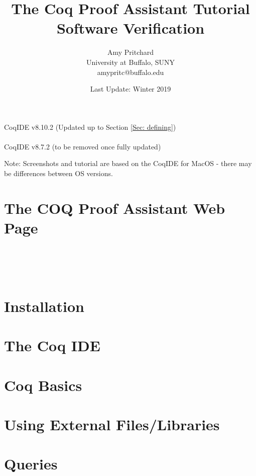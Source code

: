\documentclass{article}
\title{\textbf{The Coq Proof Assistant Tutorial} 
	\\ Software Verification}
\author{Amy Pritchard 
	\\ University at Buffalo, SUNY
	\\ amypritc@buffalo.edu}
\date{Last Update: Winter 2019}
\begin{document}
\maketitle

\begin{center}
	CoqIDE v8.10.2 (Updated up to Section \ref{Sec: defining})
\\~\\
	CoqIDE v8.7.2 (to be removed once fully updated)
\end{center}

\vfill
\noindent
{\footnotesize Note: Screenshots and tutorial are based on the CoqIDE for MacOS - there may be differences between OS versions. }

\newpage
\tableofcontents


\newpage
\section{The COQ Proof Assistant Web Page} 
	\label{Sec: webpage}
	

~\\~\\~\\
\section{Installation} 
	\label{Sec: installation}
	 


\newpage
\section{The Coq IDE} 
	\label{Sec: ide}
	


\newpage
\section{Coq Basics}
	\label{Sec: basics}
	


\newpage
\section{Using External Files/Libraries}
	\label{Sec: files}
	


\newpage
\section{Queries}
	\label{Sec: queries}
	
\end{document}
